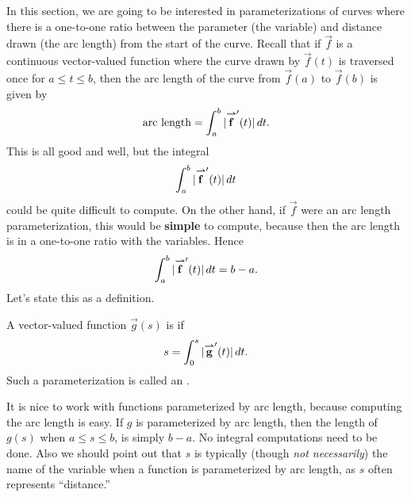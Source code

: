 \documentclass{ximera}
\begin{document}
In this section, we are going to be interested in parameterizations of
curves where there is a one-to-one ratio between the parameter (the
variable) and distance drawn (the arc length) from the start of the
curve.  Recall that if $\vec{f}$ is a continuous vector-valued
function where the curve drawn by $\vec{f}(t)$ is traversed once for
$a\le t\le b$, then the arc length of the curve from $\vec{f}(a)$ to
$\vec{f}(b)$ is given by
\[
\text{arc length} = \int_a^b |{\overset{\boldsymbol{\rightharpoonup}}{\mathbf{f}}}'(t)|\mathop{}\!d t.
\]
This is all good and well, but the integral
\[
\int_a^b |{\overset{\boldsymbol{\rightharpoonup}}{\mathbf{f}}}'(t)|\mathop{}\!d t
\]
could be quite difficult to compute. On the other hand, if $\vec{f}$
were an arc length parameterization, this would be \textbf{simple} to
compute, because then the arc length is in a one-to-one ratio with the
variables. Hence
\[
\int_a^b |{\overset{\boldsymbol{\rightharpoonup}}{\mathbf{f}}}'(t)|\mathop{}\!d t = b-a.
\]
Let's state this as a definition.

\begin{definition}
  A vector-valued function $\vec{g}(s)$ is  if
  \[
  s = \int_0^s |{\overset{\boldsymbol{\rightharpoonup}}{\mathbf{g}}}'(t)|\mathop{}\!d t.
  \]
  Such a parameterization is called an .
\end{definition}
It is nice to work with functions parameterized by arc length, because
computing the arc length is easy. If $g$ is parameterized by arc
length, then the length of $g(s)$ when $a\le s\le b$, is simply
$b-a$. No integral computations need to be done. Also we should point
out that $s$ is typically (though \textit{not necessarily}) the name
of the variable when a function is parameterized by arc length, as $s$
often represents ``distance.''
\end{document}
